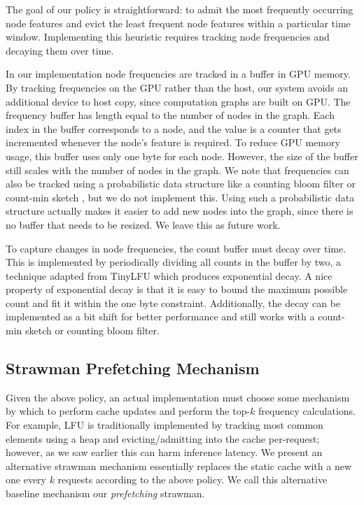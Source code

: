 The goal of our policy is straightforward: to admit the most frequently occurring node features and evict the least frequent node features within a particular time window. Implementing this heuristic requires tracking node frequencies and decaying them over time.

In our implementation node frequencies are tracked in a buffer in GPU memory. By tracking frequencies on the GPU rather than the host, our system avoids an additional device to host copy, since computation graphs are built on GPU. The frequency buffer has length equal to the number of nodes in the graph.
Each index in the buffer corresponds to a node, and the value is a counter that gets incremented whenever the node's feature is required.
To reduce GPU memory usage, this buffer uses only one byte for each node. 
However, the size of the buffer still scales with the number of nodes in the graph. We note that frequencies can also be tracked using a probabilistic data structure like a counting bloom filter \cite{Bloom_Filter_2000} or count-min sketch \cite{CountMinSketch_2005}, but we do not implement this.
Using such a probabilistic data structure actually makes it easier to add new nodes into the graph, since there is no buffer that needs to be resized.
We leave this as future work.

To capture changes in node frequencies, the count buffer must decay over time.
This is implemented by periodically dividing all counts in the buffer by two, a technique adapted from TinyLFU \cite{TinyLFU_2014} which produces exponential decay.
A nice property of exponential decay is that it is easy to bound the maximum possible count and fit it within the one byte constraint. 
Additionally, the decay can be implemented as a bit shift for better performance and still works with a count-min sketch or counting bloom filter.



\subsection{Strawman Prefetching Mechanism}
Given the above policy, an actual implementation must choose some mechanism by which to perform cache updates and perform the top-$k$ frequency calculations. For example, LFU is traditionally implemented by tracking most common elements using a heap and evicting/admitting into the cache per-request; however, as we saw earlier this can harm inference latency. We present an alternative strawman mechanism essentially replaces the static cache with a new one every $k$ requests according to the above policy. We call this alternative baseline mechanism our \textit{prefetching} strawman. 

